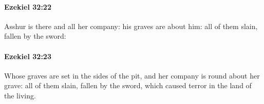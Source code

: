 		\paragraph{Ezekiel 32:22} %
			\label{EZEKIEL-32-22}

			Asshur is there and all her company: his graves are about him: all of them slain, fallen by the sword:


		\paragraph{Ezekiel 32:23} %
			\label{EZEKIEL-32-23}

			Whose graves are set in the sides of the pit, and her company is round about her grave: all of them slain, fallen by the sword, which caused terror in the land of the living.


